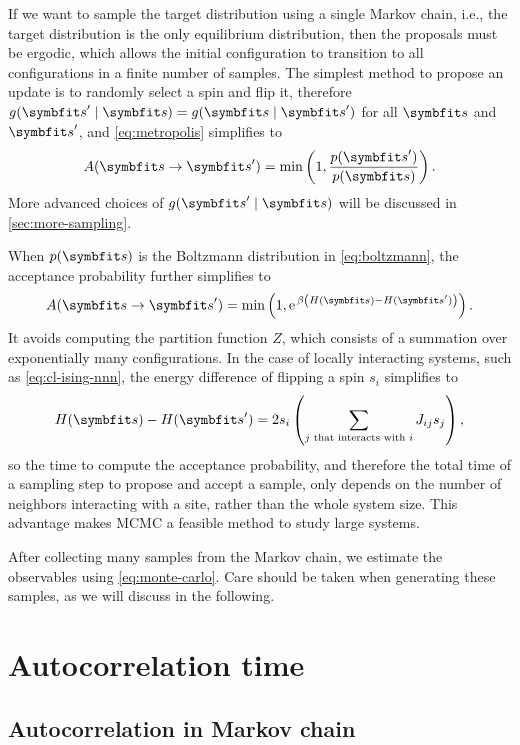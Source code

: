 If we want to sample the target distribution using a single Markov chain, i.e., the target distribution is the only equilibrium distribution, then the proposals must be ergodic, which allows the initial configuration to transition to all configurations in a finite number of samples. The simplest method to propose an update is to randomly select a spin and flip it, therefore $g(\vs' \mid \vs) = g(\vs \mid \vs')$ for all $\vs$ and $\vs'$, and \cref{eq:metropolis} simplifies to
\begin{equation}
A(\vs \to \vs') = \min\left( 1, \frac{p(\vs')}{p(\vs)} \right).
\end{equation}
More advanced choices of $g(\vs' \mid \vs)$ will be discussed in \cref{sec:more-sampling}.

When $p(\vs)$ is the Boltzmann distribution in \cref{eq:boltzmann}, the acceptance probability further simplifies to
\begin{equation}
A(\vs \to \vs') = \min\left( 1, \rme^{\,\beta \left( H(\vs) - H(\vs') \right)} \right).
\end{equation}
It avoids computing the partition function $Z$, which consists of a summation over exponentially many configurations. In the case of locally interacting systems, such as \cref{eq:cl-ising-nnn}, the energy difference of flipping a spin $s_i$ simplifies to
\begin{equation}
H(\vs) - H(\vs') = 2 s_i \left( \sum_{\text{$j$ that interacts with $i$}} J_{i j} s_j \right),
\end{equation}
so the time to compute the acceptance probability, and therefore the total time of a sampling step to propose and accept a sample, only depends on the number of neighbors interacting with a site, rather than the whole system size. This advantage makes MCMC a feasible method to study large systems.

After collecting many samples from the Markov chain, we estimate the observables using \cref{eq:monte-carlo}. Care should be taken when generating these samples, as we will discuss in the following.

\section{Autocorrelation time}
\label{sec:iat}

\subsection{Autocorrelation in Markov chain}

